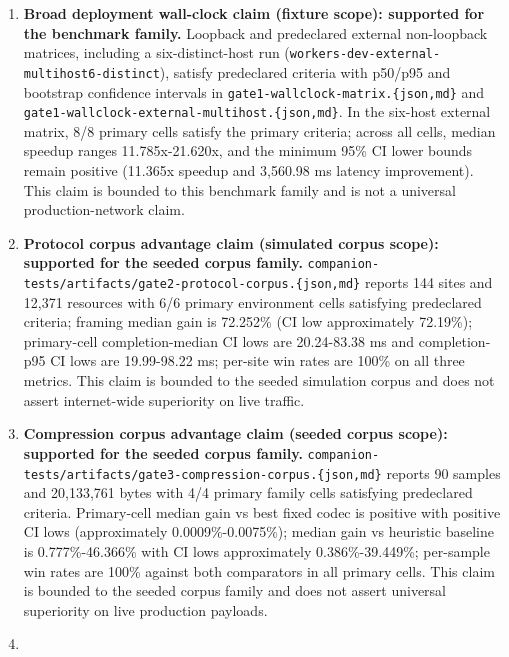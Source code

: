 \documentclass[
  11pt,
]{article}
\begin{document}
\begin{enumerate}
\def\labelenumi{\arabic{enumi}.}
\item
  \textbf{Broad deployment wall-clock claim (fixture scope): supported
  for the benchmark family.} Loopback and predeclared external
  non-loopback matrices, including a six-distinct-host run
  (\texttt{workers-dev-external-multihost6-distinct}), satisfy
  predeclared criteria with p50/p95 and bootstrap confidence intervals
  in \texttt{gate1-wallclock-matrix.\{json,md\}} and
  \texttt{gate1-\allowbreak{}wallclock-\allowbreak{}external-\allowbreak{}multihost.\allowbreak{}\{json,md\}}. In the
  six-host external matrix, 8/8 primary cells satisfy the primary
  criteria; across all cells, median speedup ranges 11.785x-21.620x, and
  the minimum 95\% CI lower bounds remain positive (11.365x speedup and
  3,560.98 ms latency improvement). This claim is bounded to this
  benchmark family and is not a universal production-network claim.
\item
  \textbf{Protocol corpus advantage claim (simulated corpus scope):
  supported for the seeded corpus family.}
  \texttt{companion-\allowbreak{}tests/\allowbreak{}artifacts/\allowbreak{}gate2-\allowbreak{}protocol-\allowbreak{}corpus.\allowbreak{}\{json,md\}}
  reports 144 sites and 12,371 resources with 6/6 primary environment
  cells satisfying predeclared criteria; framing median gain is 72.252\%
  (CI low approximately 72.19\%); primary-cell completion-median CI lows
  are 20.24-83.38 ms and completion-p95 CI lows are 19.99-98.22 ms;
  per-site win rates are 100\% on all three metrics. This claim is
  bounded to the seeded simulation corpus and does not assert
  internet-wide superiority on live traffic.
\item
  \textbf{Compression corpus advantage claim (seeded corpus scope):
  supported for the seeded corpus family.}
  \texttt{companion-\allowbreak{}tests/\allowbreak{}artifacts/\allowbreak{}gate3-\allowbreak{}compression-\allowbreak{}corpus.\allowbreak{}\{json,md\}}
  reports 90 samples and 20,133,761 bytes with 4/4 primary family cells
  satisfying predeclared criteria. Primary-cell median gain vs best
  fixed codec is positive with positive CI lows (approximately
  0.0009\%-0.0075\%); median gain vs heuristic baseline is
  0.777\%-46.366\% with CI lows approximately 0.386\%-39.449\%;
  per-sample win rates are 100\% against both comparators in all primary
  cells. This claim is bounded to the seeded corpus family and does not
  assert universal superiority on live production payloads.
\item

\end{enumerate}
\end{document}
